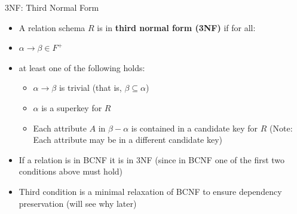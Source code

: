 \documentclass[aspectratio=169, xcolor=dvipsnames]{beamer}
\begin{document}
\begin{frame}{3NF: Third Normal Form}
    \begin{itemize}[<+->]
        \item A relation schema $R$ is in \textbf{third normal form (3NF)} if for all:
        \item $\alpha \rightarrow \beta \in F^+$
        \item at least one of the following holds:
        \begin{itemize}
            \item[$\triangleright$] $\alpha \rightarrow \beta$ is trivial (that is, $\beta \subseteq \alpha$)
            \item[$\triangleright$] $\alpha$ is a superkey for $R$
            \item[$\triangleright$] Each attribute $A$ in $\beta - \alpha$ is contained in a candidate key for $R$ (Note: Each attribute may be in a different candidate key)
        \end{itemize}
        \item If a relation is in BCNF it is in 3NF (since in BCNF one of the first two conditions above must hold)
        \item Third condition is a minimal relaxation of BCNF to ensure dependency preservation (will see why later)
    \end{itemize}
\end{frame}
\end{document}

